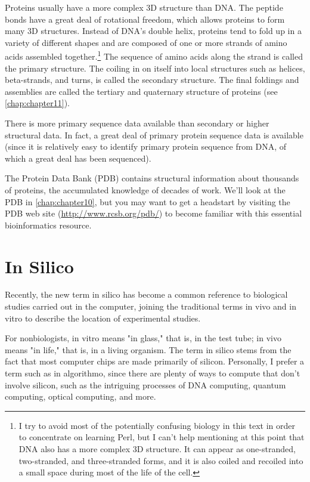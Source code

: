 Proteins usually have a more complex 3D structure than DNA. The peptide bonds have a great deal of rotational freedom, which allows proteins to form many 3D structures. Instead of DNA's double helix, proteins tend to fold up in a variety of different shapes and are composed of one or more strands of amino acids assembled together.\footnote{I try to avoid most of the potentially confusing biology in this text in order to concentrate on learning Perl, but I can't help mentioning at this point that DNA also has a more complex 3D structure. It can appear as one-stranded, two-stranded, and three-stranded forms, and it is also coiled and recoiled into a small space during most of the life of the cell.} The sequence of amino acids along the strand is called the primary structure. The coiling in on itself into local structures such as helices, beta-strands, and turns, is called the secondary structure. The final foldings and assemblies are called the tertiary and quaternary structure of proteins (see \autoref{chap:chapter11}).

There is more primary sequence data available than secondary or higher structural data. In fact, a great deal of primary protein sequence data is available (since it is relatively easy to identify primary protein sequence from DNA, of which a great deal has been sequenced).

The Protein Data Bank (PDB) contains structural information about thousands of proteins, the accumulated knowledge of decades of work. We'll look at the PDB in \autoref{chap:chapter10}, but you may want to get a headstart by visiting the PDB web site (\href{http://www.rcsb.org/pdb/}{http://www.rcsb.org/pdb/}) to become familiar with this essential bioinformatics resource. 

\section{In Silico}
Recently, the new term in silico has become a common reference to biological studies carried out in the computer, joining the traditional terms in vivo and in vitro to describe the location of experimental studies.

For nonbiologists, in vitro means "in glass," that is, in the test tube; in vivo means "in life," that is, in a living organism. The term in silico stems from the fact that most computer chips are made primarily of silicon. Personally, I prefer a term such as in algorithmo, since there are plenty of ways to compute that don't involve silicon, such as the intriguing processes of DNA computing, quantum computing, optical computing, and more.

